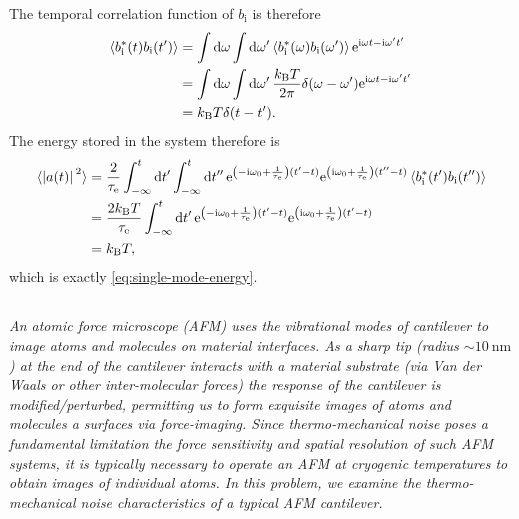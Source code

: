\documentclass[hyperref, a4paper]{article}
\newcommand*{\ii}{\mathrm{i}}
\newcommand*{\ee}{\mathrm{e}}
\newcommand*{\kB}{k_{\text{B}}}
\newcommand*{\taue}{\tau_{\text{e}}}
\newcommand*{\bi}{b_{\text{i}}}
\begin{document}
The temporal correlation function of $\bi$ is therefore
\begin{equation}
    \begin{aligned}
        \expval{\bi^*(t) \bi(t')} &= \int \dd{\omega} \int \dd{\omega'}
        \expval{\bi^*(\omega) \bi(\omega')} \ee^{\ii \omega t - \ii \omega' t'} \\
        &= \int \dd{\omega} \int \dd{\omega'}
        \frac{\kB T}{2\pi} \delta(\omega - \omega') \ee^{\ii \omega t - \ii \omega' t'} \\
        &= \kB T \delta(t - t').
    \end{aligned}
    \label{eq:si-temporal}
\end{equation} 
The energy stored in the system therefore is 
\begin{equation}
    \begin{aligned}
        \expval*{\abs*{a(t)}^2} &= \frac{2}{\taue} \int_{-\infty}^{t} \dd{t'} \int_{-\infty}^{t} \dd{t''}
        \ee^{\left( - \ii \omega_0 + \frac{1}{\taue} \right) (t' - t)} \ee^{\left( \ii \omega_0 + \frac{1}{\taue} \right) (t'' - t)}
        \expval*{\bi^*(t') \bi(t'')}  \\
        &= \frac{2\kB T}{\taue} \int_{-\infty}^{t} \dd{t'} \ee^{\left(- \ii \omega_0 + \frac{1}{\taue}\right) (t' - t)} \ee^{\left( \ii \omega_0 + \frac{1}{\taue} \right) (t' - t)} \\
        &= \kB T,
    \end{aligned}
\end{equation} 
which is exactly \eqref{eq:single-mode-energy}.

\subsection{}

\textit{An atomic force microscope (AFM) uses the vibrational modes of cantilever to image atoms and molecules on material interfaces. As a sharp tip (radius $\sim 10 \mathrm{~nm}$ ) at the end of the cantilever interacts with a material substrate (via Van der Waals or other inter-molecular forces) the response of the cantilever is modified/perturbed, permitting us to form exquisite images of atoms and molecules a surfaces via force-imaging. Since thermo-mechanical noise poses a fundamental limitation the force sensitivity and spatial resolution of such AFM systems, it is typically necessary to operate an AFM at cryogenic temperatures to obtain images of individual atoms. In this problem, we examine the thermo-mechanical noise characteristics of a typical AFM cantilever.}
\end{document}
